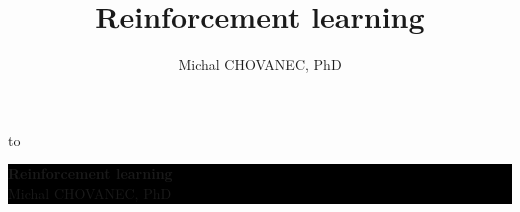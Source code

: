 \documentclass[xcolor=dvipsnames]{beamer}
\title{\color{white} \bf Reinforcement learning}
\author{\color{white} Michal CHOVANEC, PhD}
\date[EURP]{}
\begin{document}
{
    \usebackgroundtemplate
    {
        \vbox to 
    }
    \begin{frame}



    \centering
     \colorbox{black}
     {
        \begin{minipage}{7cm}
           {\LARGE \color{white} \bf Reinforcement learning} \\
           {\LARGE \color{white} Michal CHOVANEC, PhD} \\
       \end{minipage}
     }


    \end{frame}
}
\end{document}
